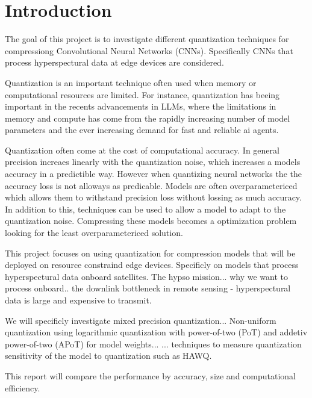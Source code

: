 \section{Introduction}\label{sec:Introduction}

The goal of this project is to investigate different quantization techniques for compressiong Convolutional Neural Networks (CNNs).
Specifically CNNs that process hyperspectural data at edge devices are considered. 

Quantization is an important technique often used when memory or computational resources are limited. 
For instance, quantization has beeing important in the recents advancements in LLMs, 
where the limitations in memory and compute has come from the rapidly increasing number of model parameters 
and the ever increasing demand for fast and reliable ai agents.

Quantization often come at the cost of computational accuracy.
In general precision increaes linearly with the quantization noise, which increases a models accuracy in a predictible way.
However when quantizing neural networks the the accuracy loss is not alloways as predicable. Models are often overparametericed which allows them 
to withstand precision loss without lossing as much accuracy. In addition to this, techniques can be used to allow a model to adapt to the quantization noise.
Compressing these models becomes a optimization problem looking for the least overparametericed solution.

This project focuses on using quantization for compression models that will be deployed on resource constraind edge devices.
Specificly on models that process hyperspectural data onboard satellites.
The hypso mission...
why we want to process onboard.. the downlink bottleneck in remote sensing - hyperspectural data is large and expensive to transmit.


We will specificly investigate mixed precision quantization... Non-uniform quantization using logarithmic quantization with power-of-two (PoT) and addetiv power-of-two (APoT) for model weights...
... techniques to measure quantization sensitivity of the model to quantization such as HAWQ.

This report will compare the performance by accuracy, size and computational efficiency.

